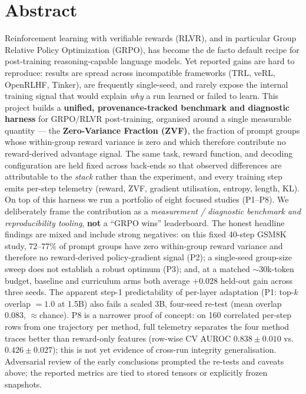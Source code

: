 \documentclass[12pt,a4paper]{report}
\begin{document}
\chapter*{Abstract}
Reinforcement learning with verifiable rewards (RLVR), and in particular Group
Relative Policy Optimization (GRPO), has become the de facto default recipe for
post-training reasoning-capable language models. Yet reported gains are hard to
reproduce: results are spread across incompatible frameworks (TRL, veRL,
OpenRLHF, Tinker), are frequently single-seed, and rarely expose the internal
training signal that would explain \emph{why} a run learned or failed to learn.
This project builds a \textbf{unified, provenance-tracked benchmark and diagnostic
harness} for GRPO/RLVR post-training, organised around a single measurable
quantity --- the \textbf{Zero-Variance Fraction (ZVF)}, the fraction of prompt
groups whose within-group reward variance is zero and which therefore contribute
no reward-derived advantage signal. The same task, reward function, and decoding configuration are held
fixed across back-ends so that observed differences are attributable to the
\emph{stack} rather than the experiment, and every training step emits per-step
telemetry (reward, ZVF, gradient utilisation, entropy, length, KL). On top of this
harness we run a portfolio of eight focused studies (P1--P8). We deliberately frame
the contribution as a \emph{measurement / diagnostic benchmark and reproducibility
tooling}, \textbf{not} a ``GRPO wins'' leaderboard. The honest headline findings
are mixed and include strong negatives: on this fixed 40-step GSM8K study,
$72$--$77\%$ of prompt groups have zero within-group reward variance and therefore
no reward-derived policy-gradient signal (P2); a single-seed group-size sweep does
not establish a robust optimum (P3); and, at a matched ${\sim}30$k-token budget,
baseline and curriculum arms both average $+0.028$ held-out gain across three seeds.
The apparent step-1 predictability of per-layer adaptation (P1: top-$k$ overlap
$=1.0$ at 1.5B) also fails a scaled 3B, four-seed re-test (mean overlap $0.083$,
${\approx}$chance). P8 is a narrower proof of concept: on 160 correlated per-step
rows from one trajectory per method, full telemetry separates the four method traces
better than reward-only features (row-wise CV AUROC $0.838\pm0.010$ vs.
$0.426\pm0.027$); this is not yet evidence of cross-run integrity generalisation.
Adversarial review of the early conclusions prompted the re-tests and caveats above;
the reported metrics are tied to stored tensors or explicitly frozen snapshots.
\end{document}
